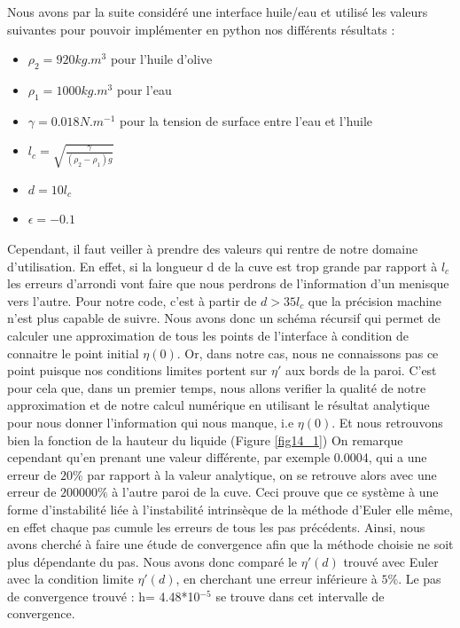\documentclass[10pt,a4paper]{article}
\begin{document}
Nous avons par la suite considéré une interface huile/eau et utilisé les valeurs suivantes pour pouvoir implémenter en python nos différents résultats : 
\newline
\begin{itemize}
	\item $\rho_{2} = 920 kg.m^{3}$ pour l'huile d'olive
	\item $\rho_{1} = 1000 kg.m^{3}$ pour l'eau
	\item $\gamma = 0.018 N.m^{-1}$ pour la tension de surface entre l'eau et l'huile
	\item  $l_{c} = \sqrt{\frac{\gamma }{(\rho_{2} - \rho_{1})g}}$
	\item $d = 10l_{c}$
	\item $\epsilon = -0.1$
\end{itemize}
\vspace{1cm}
Cependant, il faut veiller à prendre des valeurs qui rentre de notre domaine d'utilisation. En effet, si la longueur d de la cuve est trop grande par rapport à $l_{c}$ les erreurs d'arrondi vont faire que nous perdrons de l'information d'un menisque vers l'autre. Pour notre code, c'est à partir de $d >35l_{c}$ que la précision machine n'est plus capable de suivre.
\newline
\newline
Nous avons donc un schéma récursif qui permet de calculer une approximation de tous les points de l'interface à condition de connaitre le point initial $\eta(0)$. Or, dans notre cas, nous ne connaissons pas ce point puisque nos conditions limites portent sur $\eta\prime$ aux bords de la paroi. 
\newline
C'est pour cela que, dans un premier temps, nous allons verifier la qualité de notre approximation et de notre calcul numérique en utilisant le résultat analytique pour nous donner l'information qui nous manque, i.e $\eta(0)$. Et nous retrouvons bien la fonction de la hauteur du liquide (Figure \ref{fig14_1})
\newline
On remarque cependant qu'en prenant une valeur différente, par exemple 0.0004, qui a une erreur de $20 \%$ par rapport à la valeur analytique, on se retrouve alors avec une erreur de $200000 \%$ à l'autre paroi de la cuve. Ceci prouve que ce système à une forme d'instabilité liée à l'instabilité intrinsèque de la méthode d'Euler elle même, en effet chaque pas cumule les erreurs de tous les pas précédents. 
\newline\newline
Ainsi, nous avons cherché à faire une étude de convergence afin que la méthode choisie ne soit plus dépendante du pas. Nous avons donc comparé le $\eta'(d)$ trouvé avec Euler avec la condition limite $\eta'(d)$, en cherchant une erreur inférieure à $5 \%$. Le pas de convergence trouvé : h= 4.48*10$^{-5}$ se trouve dans cet intervalle de convergence. 
\end{document}
